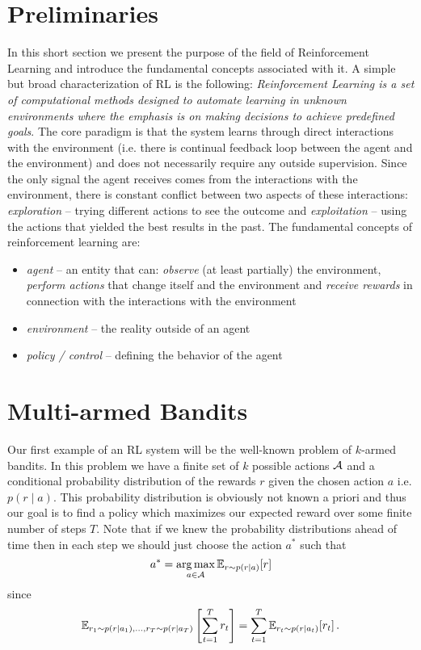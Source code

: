 \documentclass{myclass}
\begin{document}
\section{Preliminaries}

In this short section we present the purpose of the field of Reinforcement Learning and introduce
the fundamental concepts associated with it. A simple but broad characterization of RL is the
following: \emph{Reinforcement Learning is a set of computational methods designed to automate
learning in unknown environments where the emphasis is on making decisions to achieve predefined
goals}. The core paradigm is that the system learns through direct interactions with the environment
(i.e. there is continual feedback loop between the agent and the environment) and does not
necessarily require any outside supervision. Since the only signal the agent receives comes from the
interactions with the environment, there is constant conflict between two aspects of these
interactions: \emph{exploration} -- trying different actions to see the outcome and
\emph{exploitation} -- using the actions that yielded the best results in the past. The fundamental
concepts of reinforcement learning are:
\begin{itemize}

    \item \emph{agent} -- an entity that can: \emph{observe} (at least partially) the environment,
    \emph{perform actions} that change itself and the environment and \emph{receive rewards} in
    connection with the interactions with the environment

    \item \emph{environment} -- the reality outside of an agent

    \item \emph{policy / control} -- defining the behavior of the agent

\end{itemize}


\section{Multi-armed Bandits}

Our first example of an RL system will be the well-known problem of $k$-armed bandits. In this
problem we have a finite set of $k$ possible actions $\mathcal{A}$ and a conditional probability
distribution of the rewards $r$ given the chosen action $a$ i.e. $p(r \mid a)$. This probability
distribution is obviously not known a priori and thus our goal is to find a policy which maximizes
our expected reward over some finite number of steps $T$. Note that if we knew the probability
distributions ahead of time then in each step we should just choose the action $a^*$ such that
\[
    a^* = \operatorname*{arg\,max}_{a \in \mathcal{A}} \mathbb{E}_{r \sim p(r \mid a)}[r]
\]
since
\[
    \mathbb{E}_{r_1 \sim p(r \mid a_1), \ldots, r_T \sim p(r \mid a_T)} \left[ \sum_{t=1}^T r_t \right] = \sum_{t=1}^T \mathbb{E}_{r_t \sim p(r \mid a_t)} [r_t]\,.
\]
\end{document}
